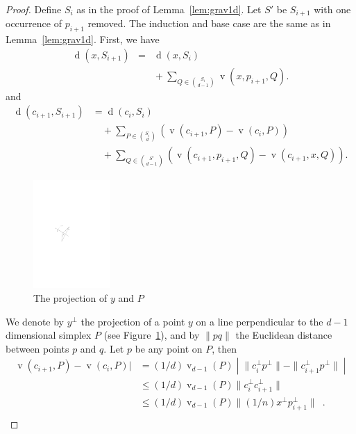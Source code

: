 \documentclass[preprint, 12pt]{elsarticle}
\DeclareMathOperator{\od}{d}
\DeclareMathOperator{\vol}{v}
\begin{document}
\begin{proof}
Define $S_i$ as in the proof of Lemma~\ref{lem:grav1d}. Let $S'$ be
$S_{i+1}$ with one occurrence of $p_{i+1}$ removed. The induction and
base case are the same as in Lemma~\ref{lem:grav1d}. First, we have
\begin{eqnarray}
\od(x,S_{i+1}) 
   & = & \od(x,S_i) \nonumber \\ 
   && {} + \sum_{Q\in\binom{S_i}{d-1}} \vol(x,p_{i+1},Q). \label{eq:o}
\end{eqnarray}
and
\begin{align}
   \od(c_{i+1},S_{i+1}) 
   &  = \od(c_i,S_{i}) \nonumber \\
   &    \quad + \sum_{P \in \binom{S_i}{d}} 
           (\vol(c_{i+1}, P)- \vol(c_i,P))
              \label{eq:i} \\
   &   \quad + \sum_{Q\in \binom{S'}{d-1}}
           (\vol(c_{i+1},p_{i+1},Q)- \vol(c_{i+1},x,Q)).
            \label{eq:ii} 
\end{align}
\begin{figure}[htb]
  \begin{center}
    \includegraphics[width=0.26\textwidth]{pics/projection.pdf}
  \end{center}
  \caption{The projection of $y$ and $P$}
  \label{fig:projection}
\end{figure}
We denote by $y^{\perp}$ the projection of a point $y$ on a line perpendicular to the $d-1$ dimensional simplex $P$ (see Figure~\ref{fig:projection}), and by $\|pq\|$ the Euclidean distance between points $p$ and $q$. Let $p$ be any point on $P$, then
\renewcommand{\frac}[2]{(#1/#2)}
    \[  
  \begin{aligned} 
    \vol(c_{i+1},P)-\vol(c_i,P)|
    & =  \frac{1}{d}  \vol_{d-1}(P) \; \left|\; \|c_i^{\perp}p^{\perp}\| -\|c_{i+1}^{\perp} p^{\perp}\|\;\right| \\
    &    \leq \frac{1}{d}  \vol_{d-1}(P)   \|c_i^{\perp}c_{i+1}^{\perp}\|\\
     &  \leq \frac{1}{d} \vol_{d-1}(P) \|\frac{1}{n}x^{\perp} p_{i+1}^{\perp}\|  \enspace .\\

\end{aligned}\]
\end{proof}
\end{document}
